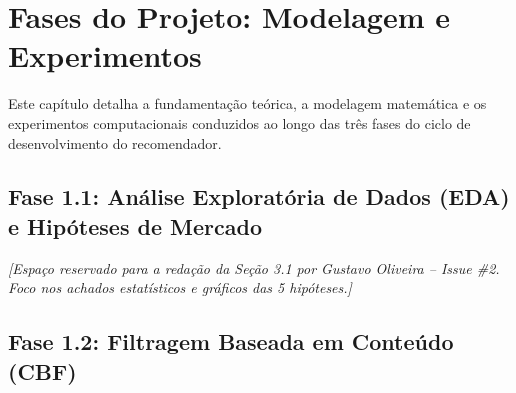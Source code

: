 % 

\section{Fases do Projeto: Modelagem e Experimentos}
\label{sec:fases_do_projeto}

Este capítulo detalha a fundamentação teórica, a modelagem matemática e os experimentos computacionais conduzidos ao longo das três fases do ciclo de desenvolvimento do recomendador.

\subsection{Fase 1.1: Análise Exploratória de Dados (EDA) e Hipóteses de Mercado}
\label{sec:fase1_eda}

\noindent\textit{[Espaço reservado para a redação da Seção 3.1 por Gustavo Oliveira -- Issue \#2. Foco nos achados estatísticos e gráficos das 5 hipóteses.]}

\subsection{Fase 1.2: Filtragem Baseada em Conteúdo (CBF)}
\label{sec:fase1_cbf}

